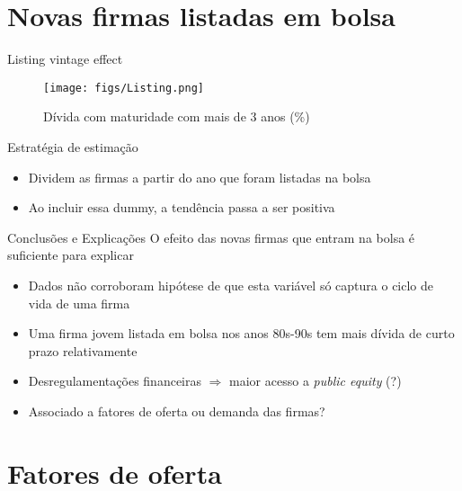 \documentclass[presentation]{beamer}
\begin{document}
\section{Novas firmas listadas em bolsa}
\label{sec:orgeb41bb6}
\begin{frame}[label={sec:org4fd6851}]{Listing vintage effect}
\begin{figure}[htbp]
\caption{Dívida com maturidade com mais de 3 anos (\%)}
\centerline{\texttt{[image: figs/Listing.png]}}
\end{figure}
\end{frame}
\begin{frame}[label={sec:org2256689}]{Estratégia de estimação}
\begin{itemize}
\item Dividem as firmas a partir do ano que foram listadas na bolsa
\item Ao incluir essa dummy, a tendência passa a ser positiva
\end{itemize}

\begin{block}{Conclusões e Explicações}
O efeito das novas firmas que entram na bolsa é suficiente para explicar
\begin{itemize}
\item Dados não corroboram hipótese de que esta variável só captura o ciclo de vida de uma firma
\item Uma firma jovem listada em bolsa nos anos 80s-90s tem mais dívida de curto prazo relativamente
\item Desregulamentações financeiras \(\Rightarrow\) maior acesso a \emph{public equity} (?)
\item Associado a fatores de oferta ou demanda das firmas?
\end{itemize}
\end{block}
\end{frame}

\section{Fatores de oferta}
\label{sec:orgc318f4d}
\end{document}
